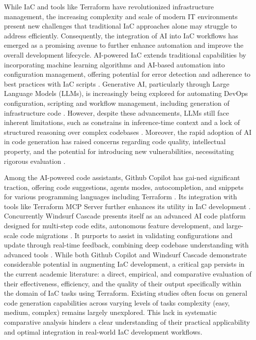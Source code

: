 While IaC and tools like Terraform have revolutionized infrastructure management, the increasing complexity and scale of modern IT environments present new challenges that traditional IaC approaches alone may struggle to address efficiently. Consequently, the integration of AI into IaC workflows has emerged as a promising avenue to further enhance automation and improve the overall development lifecycle. AI-powered IaC extends traditional capabilities by incorporating machine learning algorithms and AI-based automation into configuration management, offering potential for error detection and adherence to best practices with IaC scripts \cite{gunawat_ai-enhanced_nodate, vaiber_ai_iac_2025}. Generative AI, particularly through Large Language Models (LLMs), is increasingly being explored for automating DevOps configuration, scripting and workflow management, including generation of infrastructure code \cite{kate_generative_iac_2024}. However, despite these advancements, LLMs still face inherent limitations, such as constrains in inference-time context and a lock of structured reasoning over complex codebases \cite{khan2025kodezichronosdebuggingfirstlanguage}. Moreover, the rapid adoption of AI in code generation has raised concerns regarding code quality, intellectual property, and the potential for introducing new vulnerabilities, necessitating rigorous evaluation \cite{geladin_iac_ai_2024}.

Among the AI-powered code assistants, Github Copilot has gai-ned significant traction, offering code suggestions, agents modes, autocompletion, and snippets for various programming languages including Terraform \cite{roper_github_terraform_2024}. Its integration with tools like Terraform MCP Server further enhances its utility in IaC development \cite{thornton_why_2025, lechner_terraform_mcp_2025}. Concurrently Windsurf Cascade presents itself as an advanced AI code platform designed for multi-step code edits, autonomous feature development, and large-scale code migrations \cite{windsurf_cascade_2025}. It purports to assist in validating configurations and update through real-time feedback, combining deep codebase understanding with advanced tools \cite{windsurf_editor, saadioui_integrating_2025, sun_terraform_2025}. While both Github Copilot and Windsurf Cascade demonstrate considerable potential in augmenting IaC development, a critical gap persists in the current academic literature: a direct, empirical, and comparative evaluation of their effectiveness, efficiency, and the quality of their output specifically within the domain of IaC tasks using Terraform. Existing studies often focus on general code generation capabilities across varying levels of tasks complexity (easy, medium, complex) remains largely unexplored. This lack in systematic comparative analysis hinders a clear understanding of their practical applicability and optimal integration in real-world IaC development workflows.

